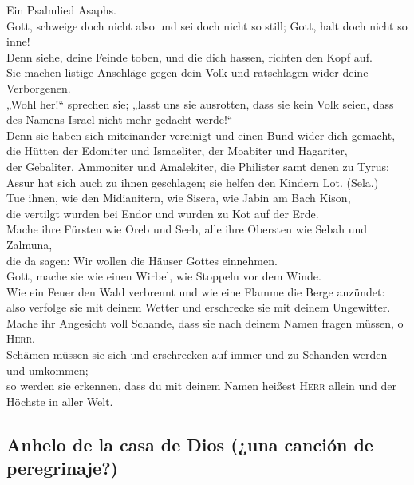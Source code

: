 Ein Psalmlied Asaphs.\\
 Gott, schweige doch nicht also und sei doch nicht so
still; Gott, halt doch nicht so inne!\\
 Denn siehe, deine Feinde toben, und die dich hassen,
richten den Kopf auf.\\
 Sie machen listige Anschläge gegen dein Volk und
ratschlagen wider deine Verborgenen.\\
 „Wohl her!{}`` sprechen sie; „lasst uns sie ausrotten,
dass sie kein Volk seien, dass des Namens Israel nicht mehr gedacht
werde!{}``\\
 Denn sie haben sich miteinander vereinigt und einen Bund
wider dich gemacht,\\
 die Hütten der Edomiter und Ismaeliter, der Moabiter und
Hagariter,\\
 der Gebaliter, Ammoniter und Amalekiter, die Philister
samt denen zu Tyrus;\\
 Assur hat sich auch zu ihnen geschlagen; sie helfen den
Kindern Lot. (Sela.)\\
 Tue ihnen, wie den Midianitern, wie Sisera, wie Jabin am
Bach Kison,\\
 die vertilgt wurden bei Endor und wurden zu Kot auf der
Erde.\\
 Mache ihre Fürsten wie Oreb und Seeb, alle ihre Obersten
wie Sebah und Zalmuna,\\
 die da sagen: Wir wollen die Häuser Gottes einnehmen.\\
 Gott, mache sie wie einen Wirbel, wie Stoppeln vor dem
Winde.\\
 Wie ein Feuer den Wald verbrennt und wie eine Flamme die
Berge anzündet:\\
 also verfolge sie mit deinem Wetter und erschrecke sie
mit deinem Ungewitter.\\
 Mache ihr Angesicht voll Schande, dass sie nach deinem
Namen fragen müssen, o \textsc{Herr}.\\
 Schämen müssen sie sich und erschrecken auf immer und zu
Schanden werden und umkommen;\\
 so werden sie erkennen, dass du mit deinem Namen heißest
\textsc{Herr} allein und der Höchste in aller Welt.

\hypertarget{anhelo-de-la-casa-de-dios-una-canciuxf3n-de-peregrinaje}{%
\subsection{Anhelo de la casa de Dios (¿una canción de
peregrinaje?)}\label{anhelo-de-la-casa-de-dios-una-canciuxf3n-de-peregrinaje}}

